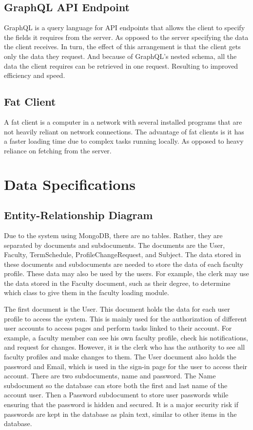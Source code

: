 \subsection{GraphQL API Endpoint}
GraphQL is a query language for API endpoints that allows the client to specify the fields it requires from the server. As opposed to the server specifying the data the client receives. In turn, the effect of this arrangement is that the client gets only the data they request. And because of GraphQL's nested schema, all the data the client requires can be retrieved in one request. Resulting to improved efficiency and speed.\cite{ref:GraphQL}

\subsection{Fat Client}
A fat client is a computer in a network with several installed programs that are not heavily reliant on network connections. The advantage of fat clients is it has a faster loading time due to complex tasks running locally. As opposed to heavy reliance on fetching from the server.\cite{ref:FatClient}


\section{Data Specifications}

\subsection{Entity-Relationship Diagram}
Due to the system using MongoDB, there are no tables. Rather, they are separated by documents and subdocuments. The documents are the User, Faculty, TermSchedule, ProfileChangeRequest, and Subject. The data stored in these documents and subdocuments are needed to store the data of each faculty profile. These data may also be used by the users. For example, the clerk may use the data stored in the Faculty document, such as their degree, to determine which class to give them in the faculty loading module.

The first document is the User. This document holds the data for each user profile to access the system. This is mainly used for the authorization of different user accounts to access pages and perform tasks linked to their account. For example, a faculty member can see his own faculty profile, check his notifications, and request for changes. However, it is the clerk who has the authority to see all faculty profiles and make changes to them. The User document also holds the password and Email, which is used in the sign-in page for the user to access their account. There are two subdocuments, name and password. The Name subdocument so the database can store both the first and last name of the account user. Then a Password subdocument to store user passwords while ensuring that the password is hidden and secured. It is a major security risk if passwords are kept in the database as plain text, similar to other items in the database.

